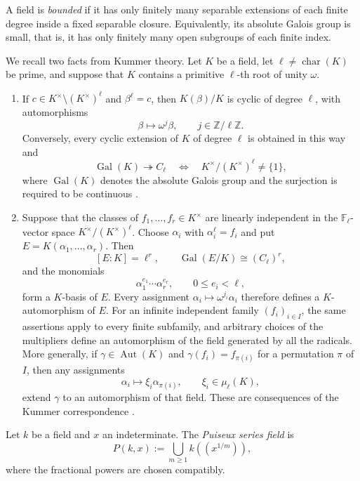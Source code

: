 \documentclass[11pt,a4paper]{amsart}
\renewcommand{\le}{\leqslant}
\renewcommand{\ge}{\geqslant}
\theoremstyle{definition}
\begin{document}
A field is \emph{bounded} if it has only finitely many
separable extensions of each finite degree inside a fixed
separable closure. Equivalently, its absolute Galois group
is small, that is, it has only finitely many open subgroups
of each finite index.

We recall two facts from Kummer theory. Let $K$ be a field,
let $\ell\ne\operatorname{char}(K)$ be prime, and suppose
that $K$ contains a primitive $\ell$-th root of unity $\omega$.

\begin{enumerate}[label=\textup{(\roman*)}]
\item
If $c\in K^\times\setminus(K^\times)^\ell$ and $\beta^\ell=c$,
then $K(\beta)/K$ is cyclic of degree $\ell$, with automorphisms
\[
\beta\longmapsto\omega^j\beta,
\qquad j\in\mathbb Z/\ell\mathbb Z.
\]
Conversely, every cyclic extension of $K$ of degree $\ell$
is obtained in this way and
\[
\operatorname{Gal}(K)\twoheadrightarrow C_\ell
\quad\Longleftrightarrow\quad
K^\times/(K^\times)^\ell\ne\{1\},
\]
where $\operatorname{Gal}(K)$ denotes the absolute Galois group
and the surjection is required to be continuous
\cite[Section~9.24, Tag~09I6]{Stacks}.

\item
Suppose that the classes of $f_1,\ldots,f_r\in K^\times$
are linearly independent in the $\mathbb F_\ell$-vector space
$K^\times/(K^\times)^\ell$. Choose $\alpha_i$ with
$\alpha_i^\ell=f_i$ and put $E=K(\alpha_1,\ldots,\alpha_r)$.
Then
\[
[E:K]=\ell^r,
\qquad
\operatorname{Gal}(E/K)\cong(C_\ell)^r,
\]
and the monomials
\[
\alpha_1^{e_1}\cdots\alpha_r^{e_r},
\qquad 0\le e_i<\ell,
\]
form a $K$-basis of $E$. Every assignment
$\alpha_i\mapsto\omega^{j_i}\alpha_i$ therefore defines
a $K$-automorphism of $E$. For an infinite independent family $(f_i)_{i\in I}$,
the same assertions apply to every finite subfamily, and arbitrary
choices of the multipliers define an automorphism of the field
generated by all the radicals. More generally, if
$\gamma\in\operatorname{Aut}(K)$ and
$\gamma(f_i)=f_{\pi(i)}$ for a permutation $\pi$ of $I$,
then any assignments
\[
\alpha_i\longmapsto\xi_i\alpha_{\pi(i)},
\qquad \xi_i\in\mu_\ell(K),
\]
extend $\gamma$ to an automorphism of that field.
These are consequences of the Kummer correspondence
\cite[Theorem~5.30 and Remark~5.32]{MilneFT}.
\end{enumerate}
Let $k$ be a field and $x$ an indeterminate. The
\emph{Puiseux series field} is
\[
P(k,x):=\bigcup_{m\ge1}k((x^{1/m})),
\]
where the fractional powers are chosen compatibly.
\end{document}
